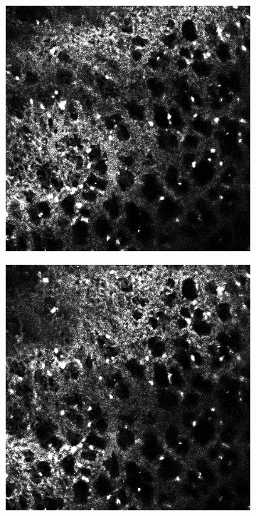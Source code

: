\begin{figure}[h]
\begin{subfigure}{.32\textwidth}
		\end{subfigure}%
		\hfill
		\begin{subfigure}{.32\textwidth}
		\includegraphics[width=\textwidth]{images/shutterseriesm170_13cropped003}
		\end{subfigure}%
		\vspace{0.3cm}
		\begin{subfigure}{.32\textwidth}
		\includegraphics[width=\textwidth]{images/shutterseriesm170_13cropped004}

\end{subfigure}
\end{figure}
